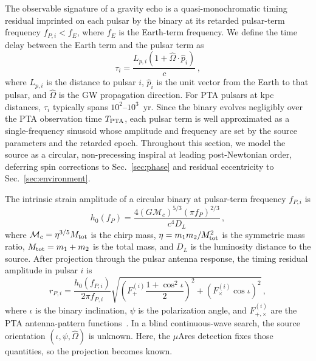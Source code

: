 \documentclass[aps,prx,twocolumn,superscriptaddress,nofootinbib,longbibliography]{revtex4-2}
\newcommand{\phat}{\hat{p}}
\newcommand{\Ohat}{\hat{\Omega}}
\begin{document}
The observable signature of a gravity echo is a quasi-monochromatic timing residual imprinted on each pulsar by the binary at its retarded pulsar-term frequency ${f_{P,i} < f_E}$, where $f_E$ is the Earth-term frequency. We define the time delay between the Earth term and the pulsar term as
\begin{equation}\label{eq:tau}
  \tau_i = \frac{L_{p,i}(1 + \Ohat \cdot \phat_i)}{c}\, ,
\end{equation}
where $L_{p,i}$ is the distance to pulsar $i$, $\phat_i$ is the unit vector from the Earth to that pulsar, and $\Ohat$ is the GW propagation direction. For PTA pulsars at kpc distances, $\tau_i$ typically spans $10^2$--$10^3$~yr. Since the binary evolves negligibly over the PTA observation time $T_{\rm PTA}$, each pulsar term is well approximated as a single-frequency sinusoid whose amplitude and frequency are set by the source parameters and the retarded epoch. Throughout this section, we model the source as a circular, non-precessing inspiral at leading post-Newtonian order, deferring spin corrections to Sec.~\ref{sec:phase} and residual eccentricity to Sec.~\ref{sec:environment}.

The intrinsic strain amplitude of a circular binary at pulsar-term frequency $f_{P,i}$ is
\begin{equation}\label{eq:strain_amp}
 h_0(f_P) = \frac{4(G\mathcal{M}_c)^{5/3}(\pi f_P)^{2/3}}{c^4 D_L}\,,
\end{equation}
where $\mathcal{M}_c = \eta^{3/5}M_{\rm tot}$ is the chirp mass, $\eta = m_1 m_2/M_{\rm tot}^2$ is the symmetric mass ratio, $M_{\rm tot} = m_1 + m_2$ is the total mass, and $D_L$ is the luminosity distance to the source. After projection through the pulsar antenna response, the timing residual amplitude in pulsar $i$ is
\begin{equation}\label{eq:residual}
 r_{P,i} = \frac{h_0(f_{P,i})}{2\pi f_{P,i}} \sqrt{ \left(F_+^{(i)} \frac{1+\cos^2\iota}{2}\right)^{\!\!2} + \left(F_\times^{(i)} \cos\iota\right)^{\!\!2} }\,,
\end{equation}
where $\iota$ is the binary inclination, $\psi$ is the polarization angle, and $F_{+,\times}^{(i)}$ are the PTA antenna-pattern functions~\cite{Mingarelli2012}. In a blind continuous-wave search, the source orientation $(\iota,\psi,\Ohat)$ is unknown. Here, the $\mu$Ares detection fixes those quantities, so the projection becomes known.
\end{document}

